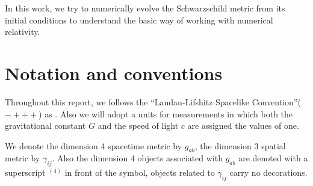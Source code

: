 In this work, we try to numerically evolve the Schwarzschild metric from its initial conditions to understand the basic way of working with numerical relativity.

\section{Notation and conventions}
Throughout this report, we follows the ``Landau-Lifshitz Spacelike Convention''($- + + +$) as \parencite{misner1973gravitation}. Also we will adopt a units for measurements in which both the gravitational constant $G$ and the speed of light $c$ are assigned the values of one.

We denote the dimension 4 spacetime metric by $g_{ab}$, the dimension 3 spatial metric
by $\gamma_{ij}$. Also the dimension 4 objects associated with $g_{ab}$ are denoted with a superscript ${}^{(4)}$ in front of the symbol, objects related to $\gamma_{ij}$ carry no decorations.